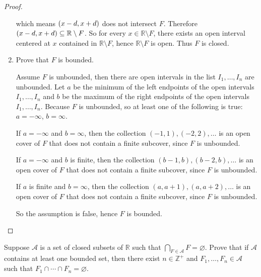 \begin{proof}
\begin{enumerate}[label={(\alph*)}]
              which means $\left({x - d, x + d}\right)$ does not intersect $F$. Therefore $\left({x - d, x + d}\right)\subseteq \mathbb{R}\setminus F$. So for every $x\in \mathbb{R}\setminus F$, there exists an open interval centered at $x$ contained in $\mathbb{R}\setminus F$, hence $\mathbb{R}\setminus F$ is open. Thus $F$ is closed.
        \item Prove that $F$ is bounded.

              Assume $F$ is unbounded, then there are open intervals in the list $I_{1}, \ldots, I_{n}$ are unbounded. Let $a$ be the minimum of the left endpoints of the open intervals $I_{1}, \ldots, I_{n}$ and $b$ be the maximum of the right endpoints of the open intervals $I_{1}, \ldots, I_{n}$. Because $F$ is unbounded, so at least one of the following is true: $a = -\infty$, $b = \infty$.

              If $a = -\infty$ and $b = \infty$, then the collection $(-1, 1), (-2, 2), \ldots$ is an open cover of $F$ that does not contain a finite subcover, since $F$ is unbounded.

              If $a = -\infty$ and $b$ is finite, then the collection $(b-1, b), (b-2, b), \ldots$ is an open cover of $F$ that does not contain a finite subcover, since $F$ is unbounded.

              If $a$ is finite and $b = \infty$, then the collection $(a, a+1), (a, a+2), \ldots$ is an open cover of $F$ that does not contain a finite subcover, since $F$ is unbounded.

              So the assumption is false, hence $F$ is bounded.
    \end{enumerate}
\end{proof}
\newpage

\begin{exercise}\label{chapter2:sectionA:exercise5}
    Suppose $\mathcal{A}$ is a set of closed subsets of $\mathbb{R}$ such that $\bigcap_{F\in\mathcal{A}}F = \varnothing$. Prove that if $\mathcal{A}$ contains at least one bounded set, then there exist $n\in\mathbb{Z}^{+}$ and $F_{1}, \ldots, F_{n}\in\mathcal{A}$ such that $F_{1}\cap\cdots\cap F_{n} = \varnothing$.
\end{exercise}

